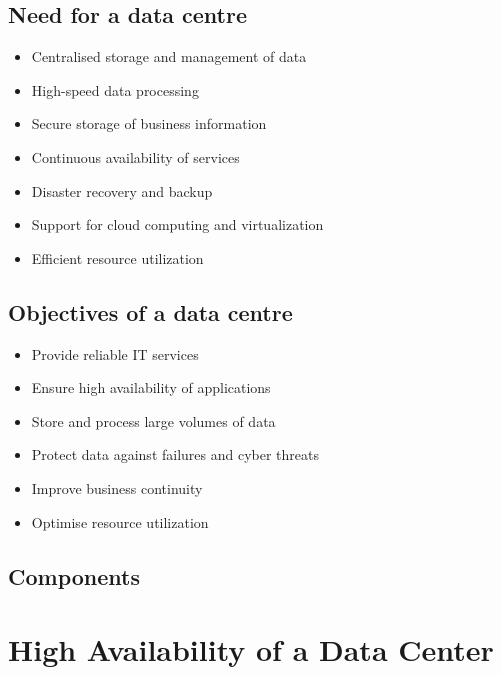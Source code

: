 \documentclass[11pt,a4paper]{article}
\begin{document}

\subsection{Need for a data centre}

\begin{itemize}\itemsep2pt
  \item Centralised storage and management of data
  \item High-speed data processing
  \item Secure storage of business information
  \item Continuous availability of services
  \item Disaster recovery and backup
  \item Support for cloud computing and virtualization
  \item Efficient resource utilization
\end{itemize}

\subsection{Objectives of a data centre}

\begin{itemize}\itemsep2pt
  \item Provide reliable IT services
  \item Ensure high availability of applications
  \item Store and process large volumes of data
  \item Protect data against failures and cyber threats
  \item Improve business continuity
  \item Optimise resource utilization
\end{itemize}

\subsection{Components}

\newpage
\section{High Availability of a Data Center}
\end{document}

